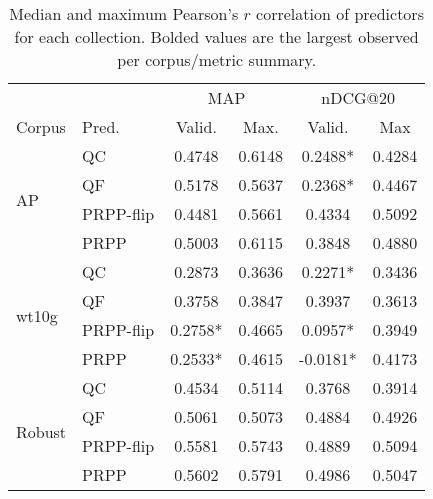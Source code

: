 \documentclass{sig-alternate}
\begin{document}
\begin{table}
\begin{tabular}{|l|l|c|c|c|c|} \hline
& & \multicolumn{2}{c|}{MAP} & \multicolumn{2}{c|}{nDCG@20} \\ \cline{3-6}
Corpus & Pred. & Valid. & Max. & Valid. & Max \\ \hline\hline
\multirow{4}{*}{AP} & QC & 0.4748 & 0.6148 & 0.2488* & 0.4284 \\ \cline{2-6}
& QF & 0.5178 & 0.5637 & 0.2368* & 0.4467 \\ \cline{2-6}
& PRPP-flip & 0.4481 & 0.5661 & 0.4334 & 0.5092 \\ \cline{2-6}
& PRPP & 0.5003 & 0.6115 & 0.3848 & 0.4880 \\ \hline\hline
\multirow{4}{*}{wt10g} & QC & 0.2873 & 0.3636 & 0.2271* & 0.3436 \\ \cline{2-6}
& QF & 0.3758 & 0.3847 & 0.3937 & 0.3613 \\ \cline{2-6}
& PRPP-flip & 0.2758* & 0.4665 & 0.0957* & 0.3949 \\ \cline{2-6}
& PRPP & 0.2533* & 0.4615 & -0.0181* & 0.4173 \\ \hline\hline
\multirow{4}{*}{Robust} & QC & 0.4534 & 0.5114 & 0.3768 & 0.3914 \\ \cline{2-6}
& QF & 0.5061 & 0.5073 & 0.4884 & 0.4926 \\ \cline{2-6}
& PRPP-flip & 0.5581 & 0.5743 & 0.4889 & 0.5094 \\ \cline{2-6}
& PRPP & 0.5602 & 0.5791 & 0.4986 & 0.5047 \\ \hline
\end{tabular}
\caption{Median and maximum Pearson's $r$ correlation of predictors for each collection. Bolded values are the largest observed per corpus/metric summary.}
\label{table.results.self.pearson}
\end{table}
\end{document}
